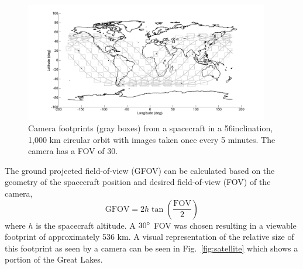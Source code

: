 \documentclass[]{aiaa-tc}%
\begin{document}
\begin{figure}[ht!]
\centering
\includegraphics[width=0.95\textwidth]{ISScoverage} %
\caption{Camera footprints (gray boxes) from a spacecraft in a 56\degree inclination, 1,000 km circular orbit with images taken once every 5 minutes.  The camera has a FOV of 30\degree.}
\label{fig:coverage}
\end{figure}
%
The ground projected field-of-view (GFOV) can be calculated based on the geometry of the spacecraft position and desired field-of-view (FOV) of the camera,
%
\begin{equation}
\textrm{GFOV}=2h\tan\left(\frac{\textrm{FOV}}{2}\right)
\label{eq:GFOV}
\end{equation}
%
where $h$ is the spacecraft altitude.  A $30\degree$ FOV was chosen resulting in a viewable footprint of approximately 536 km.  A visual representation of the relative size of this footprint as seen by a camera can be seen in Fig.~\ref{fig:satellite} which shows a portion of the Great Lakes.
%
\end{document}
